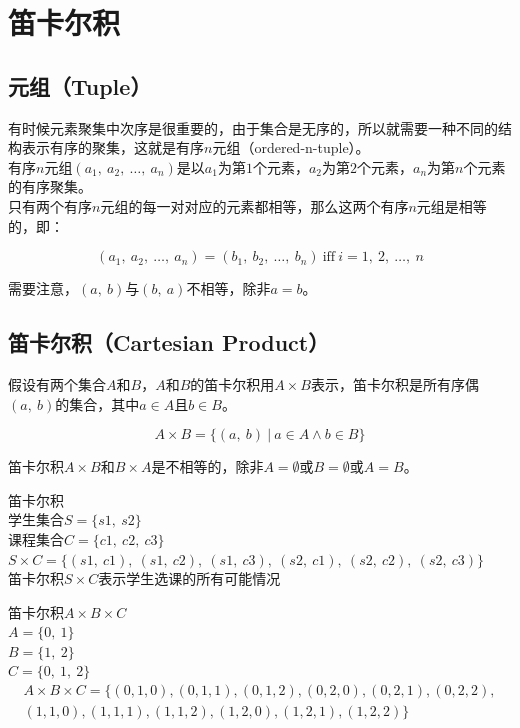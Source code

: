 \documentclass[12pt, openany, oneside]{book}
\begin{document}
\newpage

\section{笛卡尔积}

\subsection{元组（Tuple）}

有时候元素聚集中次序是很重要的，由于集合是无序的，所以就需要一种不同的结构表示有序的聚集，这就是有序$ n $元组（ordered-n-tuple）。 \\

有序$ n $元组$ (a_1,\ a_2,\ \dots,\ a_n) $是以$ a_1 $为第$ 1 $个元素，$ a_2 $为第$ 2 $个元素，$ a_n $为第$ n $个元素的有序聚集。 \\

只有两个有序$ n $元组的每一对对应的元素都相等，那么这两个有序$ n $元组是相等的，即：

$$
	(a_1,\ a_2,\ \dots,\ a_n) = (b_1,\ b_2,\ \dots,\ b_n)\ \text{iff}\ i = 1,\ 2,\ \dots,\ n
$$

需要注意，$ (a,\ b) $与$ (b,\ a) $不相等，除非$ a = b $。

\subsection{笛卡尔积（Cartesian Product）}

假设有两个集合$ A $和$ B $，$ A $和$ B $的笛卡尔积用$ A \times B $表示，笛卡尔积是所有序偶$ (a,\ b) $的集合，其中$ a \in A $且$ b \in B $。

$$
	A \times B = \{(a,\ b)\ |\ a \in A \wedge b \in B\}
$$

笛卡尔积$ A \times B $和$ B \times A $是不相等的，除非$ A = \emptyset $或$ B = \emptyset $或$ A = B $。

\begin{tcolorbox}
	笛卡尔积 \\
	学生集合$ S = \{s1,\ s2\} $ \\
	课程集合$ C = \{c1,\ c2,\ c3\} $ \\
	$ S \times C = \{(s1,\ c1),\ (s1,\ c2),\ (s1,\ c3),\ (s2,\ c1),\ (s2,\ c2),\ (s2,\ c3)\} $ \\
	笛卡尔积$ S \times C $表示学生选课的所有可能情况 \\
\end{tcolorbox}

\begin{tcolorbox}\nonumber
	笛卡尔积$ A \times B \times C $ \\
	$ A = \{0,\ 1\} $ \\
	$ B = \{1,\ 2\} $ \\
	$ C = \{0,\ 1,\ 2\} $
	\begin{align}
		A \times B \times C = \{(0, 1, 0), (0, 1, 1), (0, 1, 2), (0, 2, 0), (0, 2, 1), (0, 2, 2), \\
		(1, 1, 0), (1, 1, 1), (1, 1, 2), (1, 2, 0), (1, 2, 1), (1, 2, 2)\}
	\end{align}
\end{tcolorbox}
\end{document}
